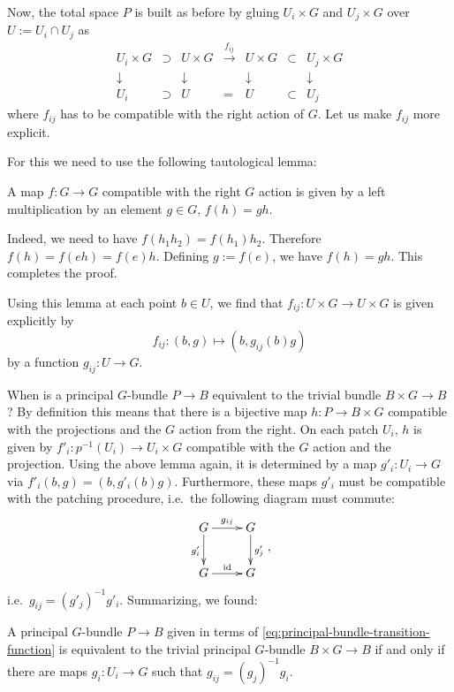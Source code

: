 \documentclass[12pt]{article}
\numberwithin{equation}{section}
\numberwithin{figure}{section}
\theoremstyle{remark}
\begin{document}
Now, the total space $P$ is built 
as before by gluing $U_i\times G$ and $U_j\times G$ over $U:=U_i \cap U_j$ as 
\begin{equation}
  \begin{array}{cccccccc}
    U_i \times G &\supset& U\times G & \xrightarrow{f_{ij}} & 
    U\times G & \subset & U_j\times G \\
    \downarrow & & \downarrow & & \downarrow & & \downarrow \\
    U_i & \supset & U & = & U & \subset & U_j
  \end{array}
\end{equation}
where $f_{ij}$ has to be compatible with the right action of $G$.
Let us make $f_{ij}$ more explicit.

For this we need to use the following tautological lemma:
\begin{lemma}
A map $f:G\to G$ compatible with the right $G$ action is given by 
a left multiplication by an element $g\in G$, $f(h)=gh$.
\end{lemma}
Indeed, we need to have $f(h_1 h_2) = f(h_1) h_2$.
Therefore $f(h)=f(eh)=f(e)h$. Defining $g:=f(e)$, we have $f(h)=gh$.
This completes the proof.

Using this lemma at each point $b\in U$,
we find that  $f_{ij}: U\times G\to U\times G$ is given explicitly by
\begin{equation}
  f_{ij}: (b,g) \mapsto (b, g_{ij}(b) g)
  \label{eq:principal-bundle-transition-function}
\end{equation}
by a function $g_{ij}: U\to G$.

When is a principal $G$-bundle $P\to B$ equivalent to the trivial bundle $B\times G \to B$?
By definition this means that there is a bijective map $h: P\to B\times G$
compatible with the projections and the $G$ action from the right.
On each patch $U_i$, $h$ is given by $f'_i: p^{-1}(U_i)\to U_i\times G$
compatible with the $G$ action and the projection.
Using the above lemma again,
it is determined by a map $g'_i: U_i\to G$ via $f'_i(b,g)=(b,g'_i(b)g)$.
Furthermore, these maps $g'_i$ must be compatible with the patching procedure, i.e.~the following diagram must commute:
\begin{equation}
\vcenter{\xymatrix{
  G \ar[r]^{g_{ij}} \ar[d]_{g'_i} & G \ar[d]^{g'_j} \\
  G \ar[r]^{\text{id}} & G 
}},
\end{equation}
i.e.~$g_{ij} = (g'_j)^{-1} g'_i$.
Summarizing, we found: 
\begin{proposition}
  A principal $G$-bundle $P\to B$
  given in terms of \eqref{eq:principal-bundle-transition-function}
  is equivalent to the trivial principal $G$-bundle $B\times G \to B$
  if and only if there are maps $g_i: U_i\to G$ such that $g_{ij} = (g_j)^{-1} g_i$.
\end{proposition}
\end{document}
